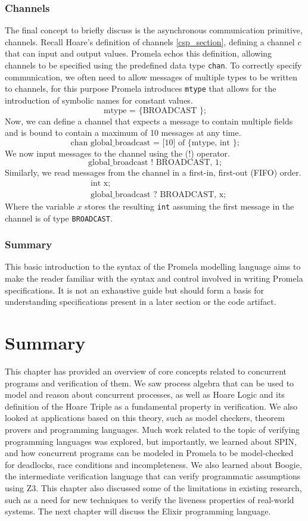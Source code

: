 \subsubsection[]{Channels}
The final concept to briefly discuss is the asynchronous communication primitive, channels. Recall Hoare's definition of channels \ref{csp_section}, defining a channel $c$ that can input and output values. Promela echos this definition, allowing channels to be specified using the predefined data type \texttt{chan}. To correctly specify communication, we often need to allow messages of multiple types to be written to channels, for this purpose Promela introduces \texttt{mtype} that allows for the introduction of symbolic names for constant values.
\[
\text{mtype = \{ BROADCAST \};}
\]
Now, we can define a channel that expects a message to contain multiple fields and is bound to contain a maximum of 10 messages at any time.
\[
\text{chan global\_broadcast = [10] of \{ mtype, int \};}
\]
We now input messages to the channel using the (!) operator.
\[
\text{global\_broadcast ! BROADCAST, 1;}
\]
Similarly, we read messages from the channel in a first-in, first-out (FIFO) order.
\[
\begin{aligned}
& \text{int x;} \\
& \text{global\_broadcast ? BROADCAST, x;}
\end{aligned}
\]
Where the variable $x$ stores the resulting \texttt{int} assuming the first message in the channel is of type \texttt{BROADCAST}.
\subsubsection[]{Summary}
This basic introduction to the syntax of the Promela modelling language aims to make the reader familiar with the syntax and control involved in writing Promela specifications. It is not an exhaustive guide but should form a basis for understanding specifications present in a later section or the code artifact.
\section{Summary}
This chapter has provided an overview of core concepts related to concurrent programs and verification of them. We saw process algebra that can be used to model and reason about concurrent processes, as well as Hoare Logic and its definition of the Hoare Triple as a fundamental property in verification. We also looked at applications based on this theory, such as model checkers, theorem provers and programming languages. Much work related to the topic of verifying programming languages was explored, but importantly, we learned about SPIN, and how concurrent programs can be modeled in Promela to be model-checked for deadlocks, race conditions and incompleteness. We also learned about Boogie, the intermediate verification language that can verify programmatic assumptions using Z3. This chapter also discussed some of the limitations in existing research, such as a need for new techniques to verify the liveness properties of real-world systems. The next chapter will discuss the Elixir programming language.

